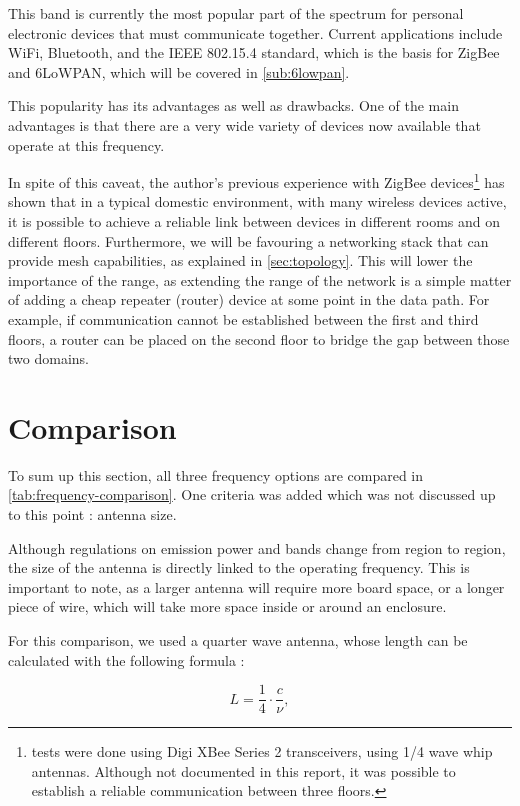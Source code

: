 This band is currently the most popular part of the spectrum for personal
electronic devices that must communicate together. Current applications include
WiFi, Bluetooth, and the IEEE 802.15.4 standard, which is the basis for ZigBee
and \ac{6LoWPAN}, which will be covered in \autoref{sub:6lowpan}.

This popularity has its advantages as well as drawbacks. One of the main
advantages is that there are a very wide variety of devices now available that
operate at this frequency. 

In spite of this caveat, the author's previous experience with ZigBee
devices\footnote{tests were done using Digi XBee Series 2 transceivers, using
1/4 wave whip antennas. Although not documented in this report, it was possible
to establish a reliable communication between three floors.}
has shown that in a typical domestic environment, with many wireless devices
active, it is possible to achieve a reliable link between devices in different
rooms and on different floors. Furthermore, we will be favouring a networking
stack that can provide mesh capabilities, as explained in
\autoref{sec:topology}. This will lower the importance of the range, as
extending the range of the network is a simple matter of adding a cheap repeater
(router) device at some point in the data path. For example, if communication
cannot be established between the first and third floors, a router can be placed
on the second floor to bridge the gap between those two domains.


\section{Comparison}

To sum up this section, all three frequency options are compared in
\autoref{tab:frequency-comparison}. One criteria was added which was not
discussed up to this point : antenna size.

Although regulations on emission power and bands change from region to region,
the size of the antenna is directly linked to the operating frequency. This is
important to note, as a larger antenna will require more board space, or
a longer piece of wire, which will take more space inside or around an
enclosure.

For this comparison, we used a quarter wave antenna, whose length can be
calculated with the following formula :

\begin{equation*}
  L = \frac{1}{4} \cdot \frac{c}{\nu},
\end{equation*}

